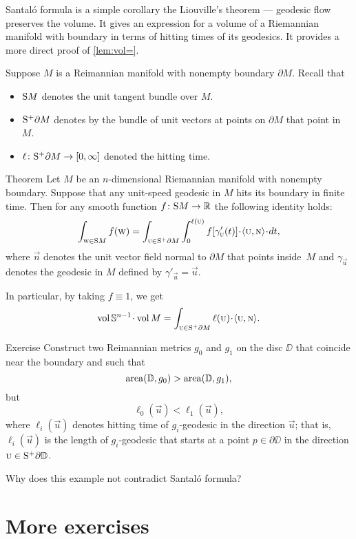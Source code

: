 Santal\'{o} formula is a simple corollary the Liouville's theorem --- geodesic flow preserves the volume.
It gives an expression for a volume of a Riemannian manifold with boundary in terms of hitting times of its geodesics.
It provides a more direct proof of \ref{lem:vol=}.

Suppose $M$ is a Reimannian manifold with nonempty boundary $\partial M$.
Recall that 
\begin{itemize}
\item $\S M$ denotes the unit tangent bundle over $M$.
\item $\S^+ \partial M$ denotes by the bundle of unit vectors at points on $\partial M$ that point in $M$.
\item $\ell\:\S^+ \partial M\to [0,\infty]$ denoted the hitting time.
\end{itemize}

\begin{thm}{Theorem}
Let $M$ be an $n$-dimensional Riemannian manifold with nonempty boundary.
Suppose that any unit-speed geodesic in $M$ hits its boundary in finite time.
Then for any smooth function $f\:\S M\to\RR$ the following identity holds:
\[\int_{\vec w\in \S M}f(\vec w)
=
\int_{\vec u\in \S^+ \partial M} 
\int_0^{\ell(\vec u)} f[\gamma'_{\vec u}(t)]\cdot\langle\vec u,\vec n\rangle\cdot dt,\]
where $\vec n$ denotes the unit vector field normal to $\partial M$ that points inside~$M$ and $\gamma_{\vec u}$ denotes the geodesic in $M$ defined by $\gamma'_{\vec u}=\vec u$.

In particular, by taking $f\equiv 1$, we get
\[\vol\SSS^{n-1}\cdot\vol M=\int_{\vec u\in \S^+ \partial M} \ell(\vec u)\cdot\langle\vec u,\vec n\rangle.\]

\end{thm}

\begin{thm}{Exercise}
Construct two Reimannian metrics $g_0$ and $g_1$ on the disc $\DD$ that coincide near the boundary and such that 
\[\area (\DD,g_0)>\area (\DD,g_1),\]
but 
\[\ell_0(\vec u)<\ell_1(\vec u),\]
where $\ell_i(\vec u)$ denotes hitting time of $g_i$-geodesic in the direction $\vec u$;
that is, 
$\ell_i(\vec u)$ is the length of $g_i$-geodesic that starts at a point $p\in \partial \DD$ in the direction $\vec u\in \S^+ \partial \DD$.

Why does this example not contradict Santal\'{o} formula?
\end{thm}

\section{More exercises}


